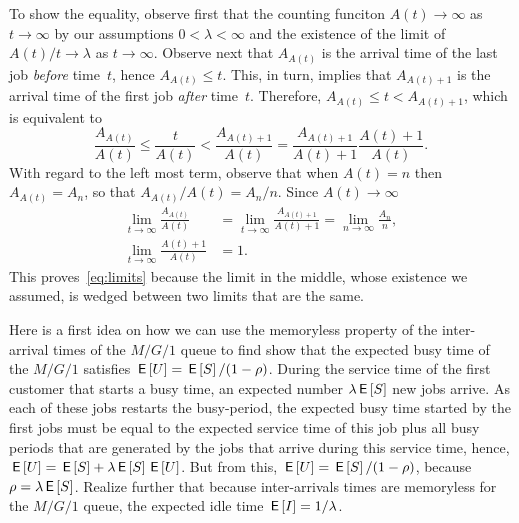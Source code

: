 \documentclass[queueing-book.tex]{subfiles}
\begin{document}
To show the equality, observe first that the counting funciton $A(t) \to \infty$ as $t\to\infty$ by our assumptions $0<\lambda<\infty$ and the existence of the limit of $A(t)/t\to\lambda$ as $t\to\infty$.
Observe next that $A_{A(t)}$ is the arrival time of the last job \emph{before} time~$t$, hence $A_{A(t)} \leq t$.
This, in turn, implies that $A_{A(t)+1}$ is the arrival time of the first job \emph{after} time~$t$.
Therefore, $A_{A(t)} \leq t < A_{A(t)+1}$, which is equivalent to
\begin{equation*}
 \frac{A_{A(t)}} {A(t)} \leq \frac{t}{A(t)} <\frac{A_{A(t)+1}}{A(t)} = \frac{A_{A(t)+1}}{A(t)+1}\frac{A(t)+1}{A(t)}.
 \end{equation*}
With regard to the left most term, observe that when $A(t)= n$ then $A_{A(t)} = A_{n}$, so that $A_{A(t)}/A(t) = A_n/n$.
Since $A(t)\to\infty$
 \begin{align*}
\lim_{t\to\infty} \frac{A_{A(t)}}{A(t)} &= \lim_{t\to\infty} \frac{A_{A(t)+1}}{A(t)+1} =  \lim_{n\to\infty} \frac{A_n}{n},\\
\lim_{t\to\infty} \frac{A(t)+1}{A(t)} &=1.
 \end{align*}
This proves~\cref{eq:limits} because the limit in the middle, whose existence we assumed, is wedged between two limits that are the same.

Here is a first idea on how we can use the memoryless property of the inter-arrival times of the $M/G/1$ queue to find show that the expected busy time of the $M/G/1$ satisfies $\,\mathsf{E}\left[U\right] = \,\mathsf{E}\left[S\right]/(1-\rho)$.
During the service time of the first customer that starts a busy time, an expected number $\lambda \,\mathsf{E}\left[S\right]$ new jobs arrive.
As each of these jobs restarts the busy-period, the expected busy time started by the first jobs must be equal to the expected service time of this job plus all busy periods that are generated by the jobs that arrive during this service time, hence, $\,\mathsf{E}\left[U\right] = \,\mathsf{E}\left[S\right] + \lambda \,\mathsf{E}\left[S\right] \,\mathsf{E}\left[U\right]$. But from this, $\,\mathsf{E}\left[U\right] = \,\mathsf{E}\left[S\right] / (1-\rho)$, because $\rho = \lambda \,\mathsf{E}\left[S\right]$.
Realize further that because inter-arrivals times are memoryless for the $M/G/1$ queue, the expected idle time $\,\mathsf{E}\left[I\right] = 1/\lambda$.
\end{document}
